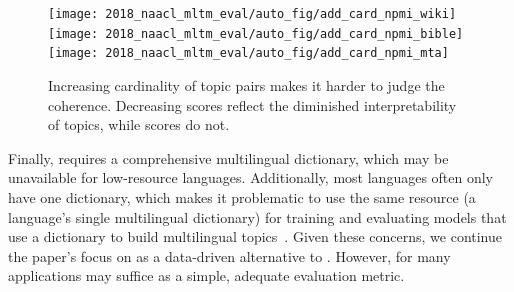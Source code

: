 \begin{figure}[t]
  \centering
  \texttt{[image: 2018\_naacl\_mltm\_eval/auto\_fig/add\_card\_npmi\_wiki]}
  \texttt{[image: 2018\_naacl\_mltm\_eval/auto\_fig/add\_card\_npmi\_bible]}
  \texttt{[image: 2018\_naacl\_mltm\_eval/auto\_fig/add\_card\_npmi\_mta]}
	\caption{Increasing cardinality of topic pairs makes it harder
          to judge the coherence. Decreasing \cnpmi{} scores reflect
          the diminished interpretability of topics, while \mta{}
          scores do not.}
	\label{fig:add-card}
\end{figure}

Finally, \mta{} requires a comprehensive multilingual dictionary,
which may be unavailable for low-resource languages.
Additionally,
most languages often only have one dictionary,
which makes it problematic to use the same resource (a
language's single multilingual dictionary) for training and evaluating
models that use a dictionary to build multilingual
topics~\cite{HuZEB14}.   Given these concerns, we continue the paper's focus on
\cnpmi{} as a data-driven alternative to \mta{}.  However, for many
applications \mta{} may suffice as a simple, adequate evaluation
metric.